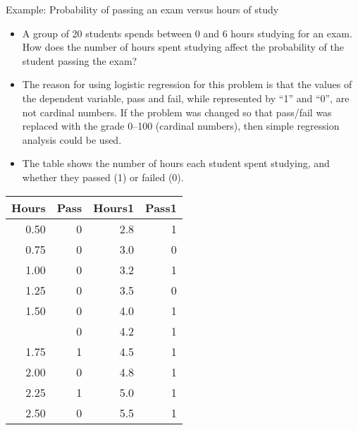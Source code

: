 \documentclass[11pt,dvipsnames,ignorenonframetext,aspectratio=169]{beamer}
\providecommand{\tightlist}{%
  \setlength{\itemsep}{0pt}\setlength{\parskip}{0pt}}
\begin{document}
\begin{frame}{Example: Probability of passing an exam versus hours of
study}
\protect\hypertarget{example-probability-of-passing-an-exam-versus-hours-of-study}{}

\begin{itemize}
\item
  A group of 20 students spends between 0 and 6 hours studying for an
  exam. How does the number of hours spent studying affect the
  probability of the student passing the exam?
\item
  The reason for using logistic regression for this problem is that the
  values of the dependent variable, pass and fail, while represented by
  ``1'' and ``0'', are not cardinal numbers. If the problem was changed
  so that pass/fail was replaced with the grade 0--100 (cardinal
  numbers), then simple regression analysis could be used.
\end{itemize}

\end{frame}

\begin{frame}{}
\protect\hypertarget{section-6}{}

\begin{itemize}
\tightlist
\item
  The table shows the number of hours each student spent studying, and
  whether they passed (1) or failed (0).
\end{itemize}

\begin{table}[H]
\centering\begingroup\fontsize{6}{8}\selectfont

\begin{tabular}{rrrr}
\toprule
Hours & Pass & Hours1 & Pass1\\
\midrule
\rowcolor{gray!6}  0.50 & 0 & 2.8 & 1\\
0.75 & 0 & 3.0 & 0\\
\rowcolor{gray!6}  1.00 & 0 & 3.2 & 1\\
1.25 & 0 & 3.5 & 0\\
\rowcolor{gray!6}  1.50 & 0 & 4.0 & 1\\
\addlinespace
1.75 & 0 & 4.2 & 1\\
\rowcolor{gray!6}  1.75 & 1 & 4.5 & 1\\
2.00 & 0 & 4.8 & 1\\
\rowcolor{gray!6}  2.25 & 1 & 5.0 & 1\\
2.50 & 0 & 5.5 & 1\\
\bottomrule
\end{tabular}
\endgroup{}
\end{table}

\end{frame}
\end{document}
